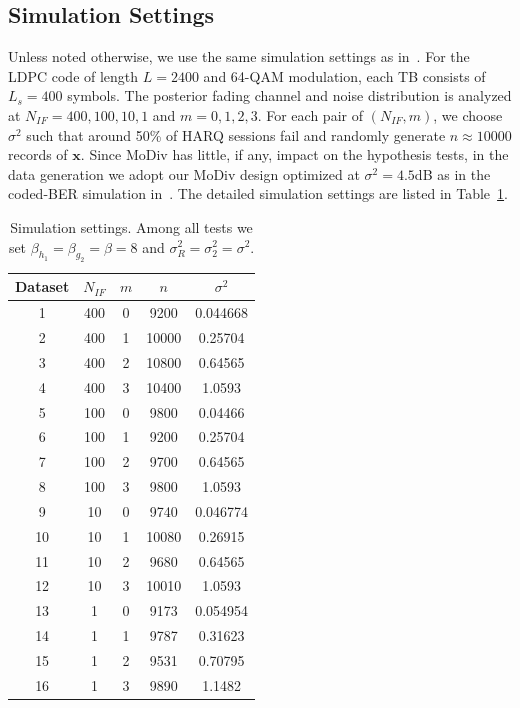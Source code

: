 \documentclass[journal,draftcls,onecolumn,12pt,twoside]{IEEEtran}
\begin{document}
\subsection{Simulation Settings}
Unless noted otherwise, we use the same simulation settings as
in~\cite[Section IV]{wu2015modulation}. For the LDPC code of length
$L=2400$ and 64-QAM modulation, each TB consists of $L_s = 400$ symbols. The
posterior fading channel and noise distribution is analyzed at $N_{IF} = 400,
100, 10, 1$ and $m = 0, 1, 2, 3$. For each pair of $(N_{IF}, m)$, we choose
$\sigma^2$ such that around 50\% of HARQ sessions fail and randomly generate
$n\approx 10000$ records of $\mathbf{x}$. Since MoDiv has little, if any, impact
on the hypothesis tests, in the data generation we adopt our MoDiv design
optimized at $\sigma^2=4.5$dB as in the coded-BER simulation
in~\cite{wu2015modulation}. The detailed simulation settings are listed in
Table~\ref{tab:settings}.
\begin{table}[!t]
  \renewcommand{\arraystretch}{1.3}
  \caption{Simulation settings. Among all tests we set $\beta_{h_1} =
  \beta_{g_2} = \beta = 8$ and $\sigma_R^2 = \sigma_2^2 = \sigma^2$.}
  \label{tab:settings}
  \centering
  \begin{tabular}{c|cccc}
    \hline
    Dataset & $N_{IF}$ & $m$ & $n$ & $\sigma^2$ \\
    \hline
    1 & 400 & 0 & 9200 & 0.044668 \\
    2 & 400 & 1 & 10000 & 0.25704 \\
    3 & 400 & 2 & 10800 & 0.64565 \\
    4 & 400 & 3 & 10400 & 1.0593 \\
    \hline
    5 & 100 & 0 & 9800 & 0.04466 \\
    6 & 100 & 1 & 9200 & 0.25704 \\
    7 & 100 & 2 & 9700 & 0.64565 \\
    8 & 100 & 3 & 9800 & 1.0593 \\
    \hline
    9 & 10 & 0 & 9740 & 0.046774 \\
    10 & 10 & 1 & 10080 & 0.26915 \\
    11 & 10 & 2 & 9680 & 0.64565 \\
    12 & 10 & 3 & 10010 & 1.0593 \\
    \hline
    13 & 1 & 0 & 9173 & 0.054954 \\
    14 & 1 & 1 & 9787 & 0.31623 \\
    15 & 1 & 2 & 9531 & 0.70795 \\
    16 & 1 & 3 & 9890 & 1.1482 \\
    \hline
  \end{tabular}
\end{table}
  
\end{document}
